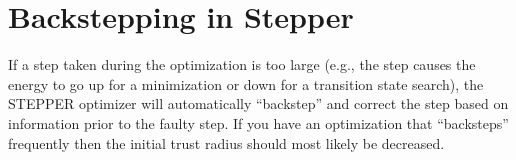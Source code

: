 %
%
%
%
%


\section{Backstepping in Stepper}

If a step taken during the optimization is too large (e.g., the step
causes the energy to go up for a minimization or down for a transition
state search), the STEPPER optimizer will automatically ``backstep''
and correct the step based on information prior to the faulty step.
If you have an optimization that ``backsteps'' frequently then the
initial trust radius should most likely be decreased.



